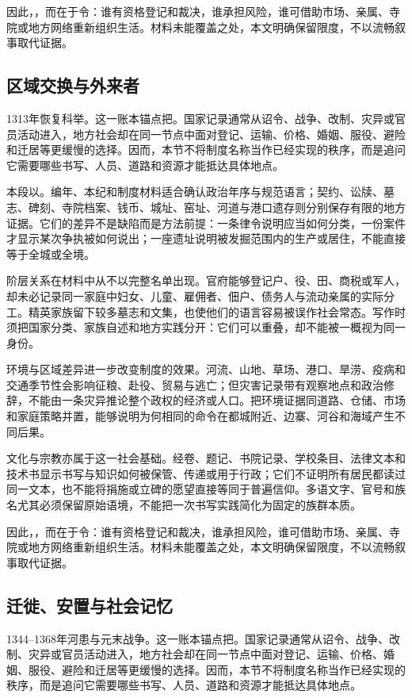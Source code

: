 因此，，而在于令：谁有资格登记和裁决，谁承担风险，谁可借助市场、亲属、寺院或地方网络重新组织生活。材料未能覆盖之处，本文明确保留限度，不以流畅叙事取代证据。

\subsection{区域交换与外来者}

1313年恢复科举。这一账本锚点把。国家记录通常从诏令、战争、改制、灾异或官员活动进入，地方社会却在同一节点中面对登记、运输、价格、婚姻、服役、避险和迁居等更缓慢的选择。因而，本节不将制度名称当作已经实现的秩序，而是追问它需要哪些书写、人员、道路和资源才能抵达具体地点。

本段以。编年、本纪和制度材料适合确认政治年序与规范语言；契约、讼牍、墓志、碑刻、寺院档案、钱币、城址、窑址、河道与港口遗存则分别保存有限的地方证据。它们的差异不是缺陷而是方法前提：一条律令说明应当如何分类，一份案件才显示某次争执被如何说出；一座遗址说明被发掘范围内的生产或居住，不能直接等于全城或全境。

阶层关系在材料中从不以完整名单出现。官府能够登记户、役、田、商税或军人，却未必记录同一家庭中妇女、儿童、雇佣者、佃户、债务人与流动亲属的实际分工。精英家族留下较多墓志和文集，也使他们的语言容易被误作社会常态。写作时须把国家分类、家族自述和地方实践分开：它们可以重叠，却不能被一概视为同一身份。

环境与区域差异进一步改变制度的效果。河流、山地、草场、港口、旱涝、疫病和交通季节性会影响征粮、赴役、贸易与逃亡；但灾害记录带有观察地点和政治修辞，不能由一条灾异推论整个政权的经济或人口。把环境证据同道路、仓储、市场和家庭策略并置，能够说明为何相同的命令在都城附近、边寨、河谷和海域产生不同后果。

文化与宗教亦属于这一社会基础。经卷、题记、书院记录、学校条目、法律文本和技术书显示书写与知识如何被保管、传递或用于行政；它们不证明所有居民都读过同一文本，也不能将捐施或立碑的愿望直接等同于普遍信仰。多语文字、官号和族名尤其必须保留原始语境，不能把一次书写实践简化为固定的族群本质。

因此，，而在于令：谁有资格登记和裁决，谁承担风险，谁可借助市场、亲属、寺院或地方网络重新组织生活。材料未能覆盖之处，本文明确保留限度，不以流畅叙事取代证据。

\subsection{迁徙、安置与社会记忆}

1344--1368年河患与元末战争。这一账本锚点把。国家记录通常从诏令、战争、改制、灾异或官员活动进入，地方社会却在同一节点中面对登记、运输、价格、婚姻、服役、避险和迁居等更缓慢的选择。因而，本节不将制度名称当作已经实现的秩序，而是追问它需要哪些书写、人员、道路和资源才能抵达具体地点。

